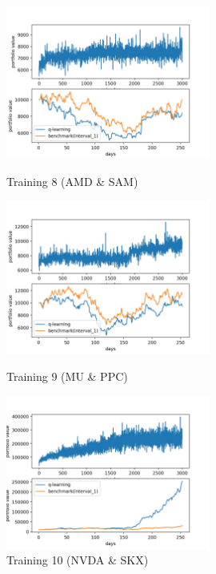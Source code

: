\begin{figure}[H]
\begin{center}
\includegraphics[clip, width=0.6\textwidth]{Graphics/q_learning_AS8.jpg} \caption{Training 8 (AMD \& SAM)}
\includegraphics[clip, width=0.6\textwidth]{Graphics/q_learning_MP9.jpg} \caption{Training 9 (MU \& PPC)}
\includegraphics[clip, width=0.6\textwidth]{Graphics/q_learning_NS10.jpg} \caption{Training 10 (NVDA \& SKX)}
\end{center}
\end{figure}

